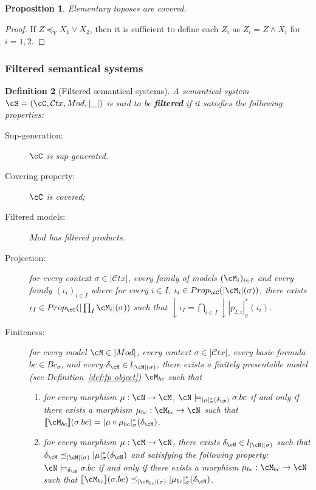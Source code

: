 \documentclass[preprint,3p,times]{elsarticle}
\newtheorem{definition}{Definition}[section]
\newtheorem{proposition}[definition]{Proposition}
\def\sem#1{[\![ #1 ] \!]}
\newcommand{\Ctx}{\mathcal{C}tx}
\begin{document}
\begin{proposition}
\label{prop:covering property}
Elementary toposes are covered.
\end{proposition}

\begin{proof}
If $Z \preceq_Y X_1 \vee X_2$, then it is sufficient to define each \(Z_i\) as $Z_i = Z \wedge X_i$ for $i = 1,2$.

\end{proof}

\subsubsection{Filtered semantical systems}
\begin{definition}[Filtered semantical systems]
\label{def:filteredsemsyst}
    A semantical system $\cS = (\cC,\Ctx,Mod,|\_|)$ is said to be {\bf filtered} if it satisfies the following properties:

    \begin{description}
        \item[Sup-generation:] $\cC$ is sup-generated.
        \item[Covering property:] \(\cC\) is covered;
        \item[Filtered models:] $Mod$ has filtered products. 
        \item[Projection:] for every context $\sigma \in |\Ctx|$, every family of models $(\cM_i)_{i \in I}$ and every family $(\iota_i)_{i \in I}$ where for every $i \in I$, $\iota_i \in Prop_\cC(|\cM_i|(\sigma))$, there exists $\iota_I \in Prop_\cC(|\prod_I \cM_i|(\sigma))$ such that $\downarrow\!\iota_I = \bigcap_{i \in I} \downarrow\!|p_{I,i}|^*_\sigma(\iota_i)$.
        \item[Finiteness:] for every model $\cM \in |Mod|$, every context \(\sigma \in |\Ctx|\), every basic formula $bc \in Bc_\sigma$, and every $\delta_\cM \in l_{|\cM|(\sigma)}$, there exists a finitely presentable model (see Definition~\ref{def:fp object}) $\cM_{bc}$ such that 

        
        \begin{enumerate}
            \item\label{enum:finiteness:1} for every morphism $\mu : \cN \to \cM$, $\cN \models_{|\mu|^*_\sigma(\delta_\cM)} \sigma.bc$ if and only if there exists a morphism \(\mu_{bc} : \cM_{bc} \to \cN\) such that \(\sem{\cM_{bc}}(\sigma.bc) = |\mu \circ \mu_{bc}|^*_\sigma(\delta_\cM)\).
            \item\label{enum:finiteness:2} for every morphism $\mu : \cM \to \cN$,  there exists $\delta_\cN \in l_{|\cN|(\sigma)}$ such that $\delta_\cM \preceq_{|\cM|(\sigma)} |\mu|^*_\sigma(\delta_\cN)$ and satisfying the following property:
            $\cN \models_{\delta_\cN} \sigma.bc$ if and only if there exists a morphism \(\mu_{bc} : \cM_{bc} \to \cN\) such that \(\sem{\cM_{bc}}(\sigma.bc) \preceq_{|\cM_{bc}|(\sigma)} |\mu_{bc}|^*_\sigma(\delta_\cN)\).
        \end{enumerate}
        

    \end{description}
\end{definition}
\end{document}
